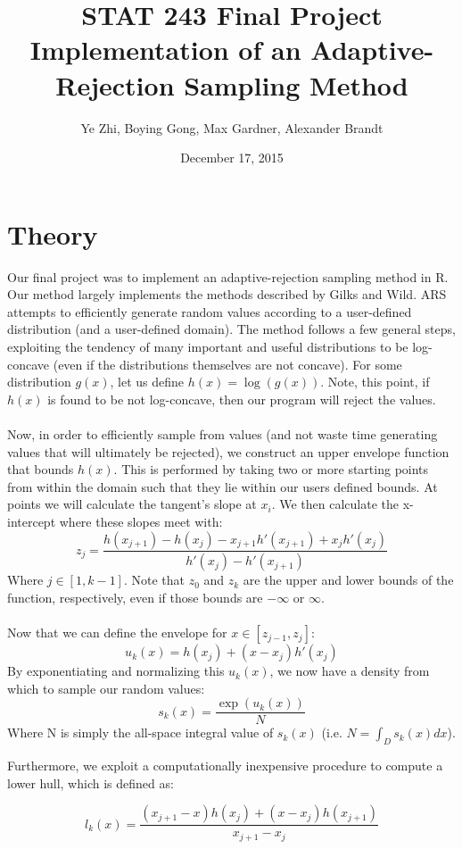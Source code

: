 \documentclass[12pt, oneside]{article}
\title{STAT 243 Final Project\\Implementation of an Adaptive-Rejection Sampling Method}
\author{Ye Zhi, Boying Gong, Max Gardner, Alexander Brandt}
\date{December 17, 2015}
\begin{document}
\maketitle

\section{Theory}

Our final project was to implement an adaptive-rejection sampling method in R.  Our method largely implements the methods described by Gilks and Wild.  ARS attempts to efficiently generate random values according to a user-defined distribution (and a user-defined domain).  The method follows a few general steps, exploiting the tendency of many important and useful distributions to be log-concave (even if the distributions themselves are not concave).  For some distribution \(g(x)\), let us define \(h(x) = \log(g(x))\).  Note, this point, if \(h(x)\) is found to be not log-concave, then our program will reject the values.
\\\\
Now, in order to efficiently sample from values (and not waste time generating values that will ultimately be rejected), we construct an upper envelope function that bounds \(h(x)\).  This is performed by taking two or more starting points from within the domain such that they lie within our users defined bounds.  At points we will calculate the tangent's slope at \(x_i\).  We then calculate the x-intercept where these slopes meet with:
\[ z_j = \frac{h(x_{j+1}) - h(x_j) - x_{j+1}h'(x_{j+1}) + x_j h'(x_j)}{h'(x_j) - h'(x_{j+1})} \]
Where \(j \in [1,k-1]\).  Note that \(z_0\) and \(z_k\) are the upper and lower bounds of the function, respectively, even if those bounds are \(-\infty\) or \(\infty\).
\\\\
Now that we can define the envelope for \(x \in [z_{j-1}, z_j]\):
\[ u_k(x) = h(x_j) + (x - x_j)h'(x_j) \]
By exponentiating and normalizing this \(u_k(x)\), we now have a density from which to sample our random values:
\[ s_k(x) = \frac{\exp(u_k(x))}{N} \]
Where N is simply the all-space integral value of \(s_k(x)\) (i.e. \(N = \int_D s_k(x) dx \)).

Furthermore, we exploit a computationally inexpensive procedure to compute a lower hull, which is defined as:

\[ l_k(x) = \frac{(x_{j+1} - x)h(x_j) + (x - x_j) h(x_{j+1})}{x_{j+1} - x_{j}} \]
\end{document}
